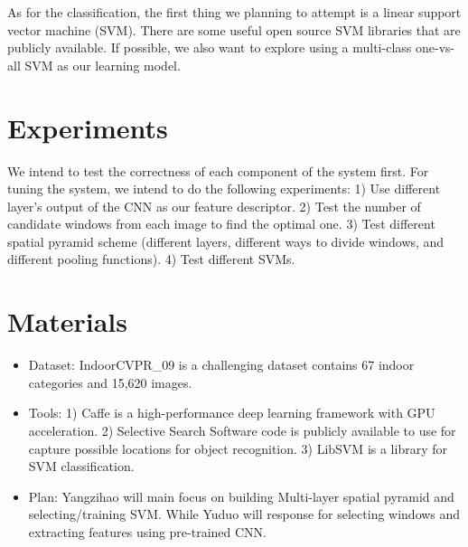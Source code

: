 \documentclass[letterpaper,twocolumn,10pt]{article}
\begin{document}
\par
    As for the classification, the first thing we planning to attempt is
    a linear support vector machine (SVM). There are some useful open source
    SVM libraries that are publicly available.  If possible, we also want to
    explore using a multi-class one-vs-all SVM as our learning model.

\section{Experiments}
We intend to test the correctness of each component of the system first.
For tuning the system, we intend to do the following experiments:
1) Use different layer's output of the CNN as our feature descriptor.
2) Test the number of candidate windows from each image to find the optimal one.
3) Test different spatial pyramid scheme (different layers, different ways to
divide windows, and different pooling functions).
4) Test different SVMs.

\section{Materials}
	\begin{itemize}
	\item{Dataset:}
	IndoorCVPR\_09\cite{DATA} is a challenging dataset contains 67
	indoor categories and 15,620 images.

	\item{Tools:}
	1) Caffe\cite{CAFFE} is a high-performance deep learning framework
	with GPU acceleration.
	2) Selective Search Software\cite{SS} code is publicly available to use
	for capture possible locations for object recognition.
	3) LibSVM\cite{SVM} is a library for SVM classification.

	\item{Plan:}
	Yangzihao will main focus on building Multi-layer spatial pyramid and
	selecting/training SVM. While Yuduo will response for selecting windows and
	extracting features using pre-trained CNN.
	\end{itemize}
\end{document}
